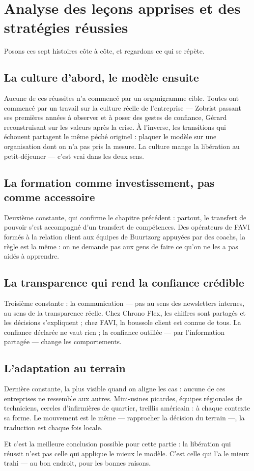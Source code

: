 \section{Analyse des leçons apprises et des stratégies réussies}

Posons ces sept histoires côte à côte, et regardons ce qui se répète.

\subsection{La culture d'abord, le modèle ensuite}

Aucune de ces réussites n'a commencé par un organigramme cible. Toutes ont commencé par un travail sur la culture réelle de l'entreprise — Zobrist passant ses premières années à observer et à poser des gestes de confiance, Gérard reconstruisant sur les valeurs après la crise. À l'inverse, les transitions qui échouent partagent le même péché originel : plaquer le modèle sur une organisation dont on n'a pas pris la mesure. La culture mange la libération au petit-déjeuner — c'est vrai dans les deux sens.

\subsection{La formation comme investissement, pas comme accessoire}

Deuxième constante, qui confirme le chapitre précédent : partout, le transfert de pouvoir s'est accompagné d'un transfert de compétences. Des opérateurs de FAVI formés à la relation client aux équipes de Buurtzorg appuyées par des coachs, la règle est la même : on ne demande pas aux gens de faire ce qu'on ne les a pas aidés à apprendre.

\subsection{La transparence qui rend la confiance crédible}

Troisième constante : la communication — pas au sens des newsletters internes, au sens de la transparence réelle. Chez Chrono Flex, les chiffres sont partagés et les décisions s'expliquent ; chez FAVI, la boussole client est connue de tous. La confiance déclarée ne vaut rien ; la confiance outillée — par l'information partagée — change les comportements.

\subsection{L'adaptation au terrain}

Dernière constante, la plus visible quand on aligne les cas : aucune de ces entreprises ne ressemble aux autres. Mini-usines picardes, équipes régionales de techniciens, cercles d'infirmières de quartier, treillis américain : à chaque contexte sa forme. Le mouvement est le même — rapprocher la décision du terrain —, la traduction est chaque fois locale.

Et c'est la meilleure conclusion possible pour cette partie : la libération qui réussit n'est pas celle qui applique le mieux le modèle. C'est celle qui l'a le mieux trahi — au bon endroit, pour les bonnes raisons.
